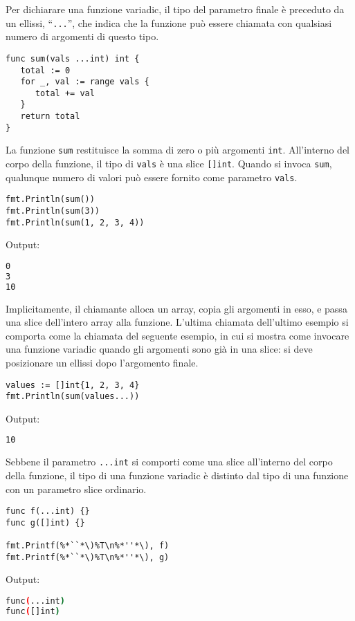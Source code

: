 Per dichiarare una funzione variadic, il tipo del parametro finale è preceduto da un ellissi, ``\verb|...|'', che indica che la funzione può essere chiamata con qualsiasi numero di argomenti di questo tipo.
\begin{lstlisting}[frame=single, label={lst:lstlisting4-7.1}]
func sum(vals ...int) int {
   total := 0
   for _, val := range vals {
      total += val
   }
   return total
}
\end{lstlisting}
La funzione \verb|sum| restituisce la somma di zero o più argomenti \verb|int|.
All'interno del corpo della funzione, il tipo di \verb|vals| è una slice \verb|[]int|.
Quando si invoca \verb|sum|, qualunque numero di valori può essere fornito come parametro \verb|vals|.
\begin{lstlisting}[frame=single, label={lst:lstlisting4-7.2}]
fmt.Println(sum())
fmt.Println(sum(3))
fmt.Println(sum(1, 2, 3, 4))
\end{lstlisting}
Output:
\begin{lstlisting}[language=bash, frame=L, label={lst:lstlisting4-7.3}]
0
3
10
\end{lstlisting}
Implicitamente, il chiamante alloca un array, copia gli argomenti in esso, e passa una slice dell'intero array alla funzione.
L'ultima chiamata dell'ultimo esempio si comporta come la chiamata del seguente esempio, in cui si mostra come invocare una funzione variadic quando gli argomenti sono già in una slice: si deve posizionare un ellissi dopo l'argomento finale.
\begin{lstlisting}[frame=single, label={lst:lstlisting4-7.4}]
values := []int{1, 2, 3, 4}
fmt.Println(sum(values...))
\end{lstlisting}
Output:
\begin{lstlisting}[language=bash, frame=L, label={lst:lstlisting4-7.5}]
10
\end{lstlisting}
Sebbene il parametro \verb|...int| si comporti come una slice all'interno del corpo della funzione, il tipo di una funzione variadic è distinto dal tipo di una funzione con un parametro slice ordinario.
\begin{lstlisting}[frame=single, label={lst:lstlisting4-7.6}]
func f(...int) {}
func g([]int) {}

fmt.Printf(%*``*\)%T\n%*''*\), f)
fmt.Printf(%*``*\)%T\n%*''*\), g)
\end{lstlisting}
Output:
\begin{lstlisting}[language=bash, frame=L, label={lst:lstlisting4-7.7}]
func(...int)
func([]int)
\end{lstlisting}


